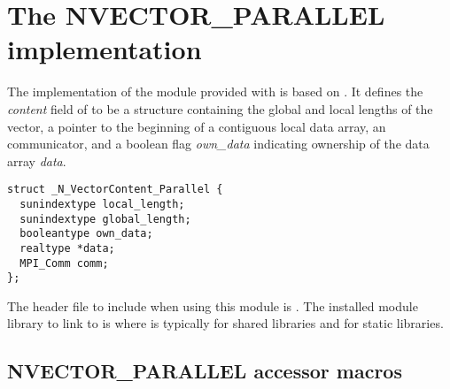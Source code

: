 %
\section{The NVECTOR\_PARALLEL implementation}\label{ss:nvec_par}

The {\nvecp} implementation of the {\nvector} module provided with
{\sundials} is based on {\mpi}.  It defines the {\em content}
field of  to be a structure containing the global and local lengths 
of the vector, a pointer to the beginning of a contiguous local data array,
an {\mpi} communicator, and a boolean flag {\em own\_data} indicating ownership of 
the data array {\em data}.
\begin{verbatim} 
struct _N_VectorContent_Parallel {
  sunindextype local_length;
  sunindextype global_length;
  booleantype own_data;
  realtype *data;
  MPI_Comm comm;
};
\end{verbatim}

The header file to include when using this module is .
The installed module library to link to is
where  is typically  for shared libraries and 
for static libraries.


\subsection{NVECTOR\_PARALLEL accessor macros}
\label{ss:nvec_par_macros}

